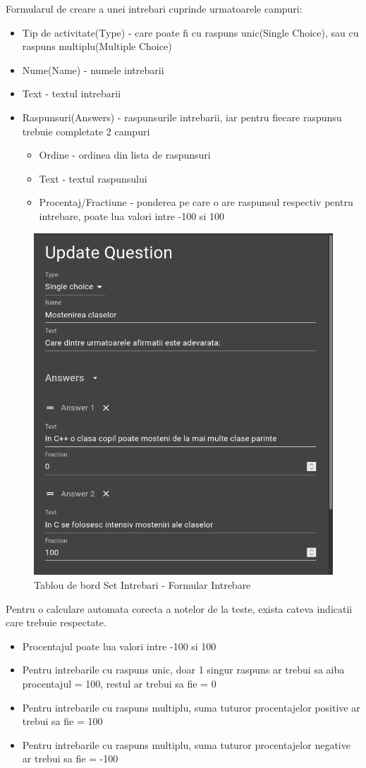 \documentclass[12pt, a4paper, oneside, romanian]{teza-upb}
\begin{document}
Formularul de creare a unei intrebari cuprinde urmatoarele campuri:
\begin{itemize}
	\item Tip de activitate(Type) - care poate fi cu raspuns unic(Single Choice), sau cu raspuns multiplu(Multiple Choice)
	\item Nume(Name) - numele intrebarii
	\item Text - textul intrebarii
	\item Raspunsuri(Answers) - raspunsurile intrebarii, iar pentru fiecare raspunsu trebuie completate 2 campuri
		\begin{itemize}
			\item Ordine - ordinea din lista de raspunsuri
			\item Text - textul raspunsului
			\item Procentaj/Fractiune - ponderea pe care o are raspunsul respectiv pentru intrebare, poate lua valori intre -100 si 100
		\end{itemize}
\end{itemize}

\begin{figure}[H]
\centering
\includegraphics*[width=0.7\columnwidth]{tablou-de-bord-set-intrebari-formular-intrebare}
\caption{Tablou de bord Set Intrebari - Formular Intrebare}
\label{tablou-de-bord-set-intrebari-formular-intrebare}
\end{figure}

Pentru o calculare automata corecta a notelor de la teste, exista cateva indicatii care trebuie respectate.
\begin{itemize}
	\item Procentajul poate lua valori intre -100 si 100
	\item Pentru intrebarile cu raspuns unic, doar 1 singur raspuns ar trebui sa aiba procentajul = 100, restul ar trebui sa fie = 0
	\item Pentru intrebarile cu raspuns multiplu, suma tuturor procentajelor positive ar trebui sa fie = 100
	\item Pentru intrebarile cu raspuns multiplu, suma tuturor procentajelor negative ar trebui sa fie = -100
\end{itemize}
\end{document}
